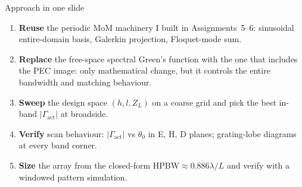 \documentclass[11pt,aspectratio=169]{beamer}
\begin{document}
\begin{frame}{Approach in one slide}
\begin{enumerate}
\setlength\itemsep{6pt}
\item \textbf{Reuse} the periodic MoM machinery I built in Assignments~5--6:
      sinusoidal entire-domain basis, Galerkin projection, Floquet-mode sum.
\item \textbf{Replace} the free-space spectral Green's function with the
      one that includes the PEC image: only mathematical change, but it controls
      the entire bandwidth and matching behaviour.
\item \textbf{Sweep} the design space $(h, l, Z_L)$ on a coarse grid
      and pick the best in-band $|\Gamma_{\text{act}}|$ at broadside.
\item \textbf{Verify} scan behaviour: $|\Gamma_{\text{act}}|$ vs $\theta_0$ in E, H, D
      planes; grating-lobe diagrams at every band corner.
\item \textbf{Size} the array from the closed-form $\text{HPBW}\approx 0.886\lambda/L$
      and verify with a windowed pattern simulation.
\end{enumerate}
\end{frame}
\end{document}
